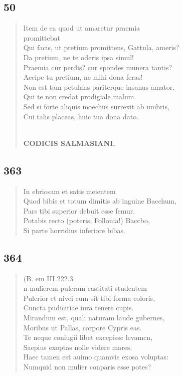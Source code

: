 \documentclass[11pt, a4paper]{report}
\begin{document}
            \subsection*{50}
      \begin{verse}
      Item de ea quod ut amaretur praemia \\ promittebat \\ Qui facis, ut pretium promittens, Gattula, ameris? \\ Da pretium, ne te oderis ipsa simul! \\ Praemia cur perdis? cur spondes munera tantis? \\ Accipe tu pretium, ne mihi dona feras! \\ Non est tam petulans pariterque insanus amator, \\ Qui te non credat prodigiale malum. \\ Sed si forte aliquis moechus surrexit ab umbris, \\ Cui talis placeas, huic tua dona dato. \\ 
        ﻿\pagebreak 
    \begin{center} \textbf{CODICIS SALMASIANI.} \end{center} \marginpar{[283]} 
      \end{verse}
  
            \subsection*{363}
      \begin{verse}
      In ebriosam et satis meientem \\ Quod bibis  \lbrack et \rbrack  totum dimitis ab inguine Bacchum, \\ Pars tibi superior debuit esse femur. \\ Potabis recto (poteris, Follonia!) Baccbo, \\ Si parte horridius inferiore bibas. \\ 
      \end{verse}
  
            \subsection*{364}
      \begin{verse}
      (B. em III 222.3 \\ n mulierem pulcram eastitati studentem \\ Pulcrior et nivei cum sit tibi forma coloris, \\ Cuncta pudicitiae iura tenere cupis. \\ Mirandum est, quali naturam laude gubernes, \\ Moribus ut Pallas, corpore Cypris eas. \\ Te neque coniugii libet excepisse levamcn, \\ Saepius exoptas nolle videre mares. \\ Haec tamen est auimo quamvis exosa voluptas: \\ Numquid non mulier conparis esse potes? \\ 
      \end{verse}
  
\end{document}
